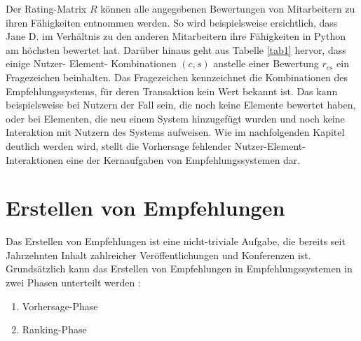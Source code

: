 Der Rating-Matrix $R$ können alle angegebenen Bewertungen von Mitarbeitern zu ihren Fähigkeiten entnommen werden.
So wird beispielsweise ersichtlich, dass Jane D. im Verhältnis zu den anderen Mitarbeitern ihre Fähigkeiten in Python am höchsten bewertet hat.
Darüber hinaus geht aus Tabelle \ref{tab1} hervor, dass einige Nutzer- Element- Kombinationen $(c,s)$ anstelle einer Bewertung $r_{cs}$ ein Fragezeichen beinhalten.
Das Fragezeichen kennzeichnet die Kombinationen des Empfehlungssystems, für deren Transaktion kein Wert bekannt ist.
Das kann beispielsweise bei Nutzern der Fall sein, die noch keine Elemente bewertet haben, oder bei Elementen, die neu einem System hinzugefügt wurden und noch keine Interaktion mit Nutzern des Systems aufweisen.
Wie im nachfolgenden Kapitel deutlich werden wird, stellt die Vorhersage fehlender Nutzer-Element-Interaktionen eine der Kernaufgaben von Empfehlungssystemen dar.

\section{Erstellen von Empfehlungen}
\label{ch:empfehlungssysteme:empfehlungserstellung}
Das Erstellen von Empfehlungen ist eine nicht-triviale Aufgabe, die bereits seit Jahrzehnten Inhalt zahlreicher Veröffentlichungen und Konferenzen ist.
Grundsätzlich kann das Erstellen von Empfehlungen in Empfehlungssystemen in zwei Phasen unterteilt werden \cite[S. 405]{unternährer:article}\cite[S. 854]{ricci:book}:
\begin{enumerate}
	\item Vorhersage-Phase
	\item Ranking-Phase
\end{enumerate}

